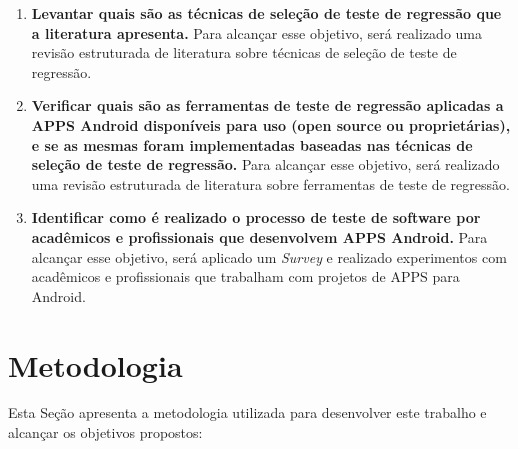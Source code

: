\begin{enumerate}[label=\bf O\arabic*,leftmargin=1.5cm]

    \item \textbf{Levantar quais são as técnicas de seleção de teste de regressão que a literatura apresenta.} Para alcançar esse objetivo, será realizado uma revisão estruturada de literatura sobre técnicas de seleção de teste de regressão.
    
    \item \textbf{Verificar quais são as ferramentas de teste de regressão aplicadas a \ac{APPS} Android disponíveis para uso (open source ou proprietárias), e se as mesmas foram implementadas baseadas nas técnicas de seleção de teste de regressão.} Para alcançar esse objetivo, será realizado uma revisão estruturada de literatura sobre ferramentas de teste de regressão.
    
    \item \textbf{Identificar como é realizado o processo de teste de software por acadêmicos e profissionais que desenvolvem \ac{APPS} Android.} Para alcançar esse objetivo, será aplicado um \textit{Survey} e realizado experimentos com acadêmicos e profissionais que trabalham com projetos de \ac{APPS} para Android.


\end{enumerate}



\section{Metodologia}\label{sec:metodologia}


Esta Seção apresenta a metodologia utilizada para desenvolver este trabalho e alcançar os objetivos propostos:


